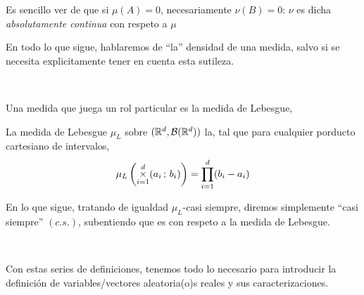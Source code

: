 Es sencillo ver  de que si $\mu(A)  = 0$, necesariamente $\nu(B) =  0$: $\nu$ es
dicha {\it absolutamente continua} con  respeto a $\mu$ 

En todo lo que  sigue, hablaremos de ``la'' densidad de una  medida, salvo si se
necesita  explicitamente  tener  en  cuenta esta  sutileza.

\

Una medida que juega un rol particular es la medida de Lebesgue,
%
\begin{definicion}
  La medida de  Lebesgue $\mu_L$ sobre $(\mathbb{R}^d,\mathcal{B}(\mathbb{R}^d))$ la,  tal que para
  cualquier porducto cartesiano de intervalos,
  \[
  \mu_L\left(  \operatorname*{\times}_{i=1}^d  (a_i  \,  ;  \, b_i)  \right)  =  \prod_{i=1}^d
  (b_i-a_i)
  \]
\end{definicion}

En lo que sigue, tratando  de igualdad $\mu_L$-casi siempre, diremos simplemente
``casi  siempre''  $(c.s.)$, subentiendo  que  es con  respeto  a  la medida  de
Lebesgue.

\

Con estas series  de definiciones, tenemos todo lo  necesario para introducir la
definici\'on de variables/vectores aleatoria(o)s reales y sus caracterizaciones.



\label{sec:MP:VAGeneral}

